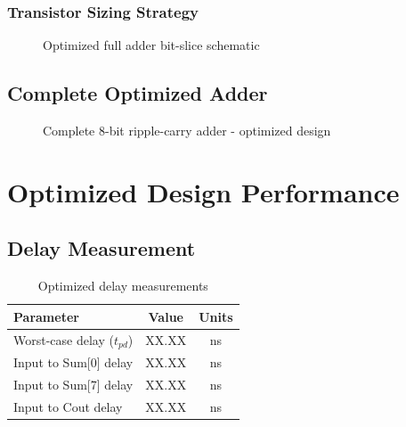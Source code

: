 \documentclass[12pt,letterpaper]{article}
\begin{document}
\subsubsection{Transistor Sizing Strategy}

\begin{figure}[H]
    \centering
    \caption{Optimized full adder bit-slice schematic}
    \label{fig:optimized_bitslice}
\end{figure}

\subsection{Complete Optimized Adder}

\begin{figure}[H]
    \centering
    \caption{Complete 8-bit ripple-carry adder - optimized design}
    \label{fig:optimized_8bit}
\end{figure}

\section{Optimized Design Performance}
\label{sec:optimized_metrics}


\subsection{Delay Measurement}

\begin{table}[H]
\centering
\caption{Optimized delay measurements}
\label{tab:optimized_delay}
\begin{tabular}{@{}lcc@{}}
\toprule
\textbf{Parameter} & \textbf{Value} & \textbf{Units} \\
\midrule
Worst-case delay ($t_{pd}$) & XX.XX & ns \\
Input to Sum[0] delay & XX.XX & ns \\
Input to Sum[7] delay & XX.XX & ns \\
Input to Cout delay & XX.XX & ns \\
\bottomrule
\end{tabular}
\end{table}
\end{document}
